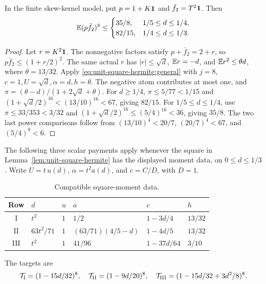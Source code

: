 \begin{corollary}
\label{cor:unit-square:two-step-path}
In the finite skew-kernel model, put \(p=1+K\mathbf1\) and
\(\bar f_2=T^2\mathbf1\). Then
\begin{equation}\label{eq:unit-square:two-step-path}
 \mathbb E(p\bar f_2)^8\le
 \begin{cases}
  35/8,&1/5\le d\le1/4,\\
  82/15,&1/4\le d\le1/3.
 \end{cases}
\end{equation}
\end{corollary}
\begin{proof}
Let \(r=K^2\mathbf1\). The nonnegative factors satisfy
\(p+\bar f_2=2+r\), so \(p\bar f_2\le(1+r/2)^2\).
The same actual \(r\) has
\(|r|\le\sqrt d\), \(\mathbb E r=-d\), and \(\mathbb E r^2\le\theta d\),
where \(\theta=13/32\). Apply
\eqref{eq:unit-square-hermite:general} with \(j=8\),
\(c=1,U=\sqrt d,\alpha=d,h=\theta\).
The negative atom contributes at most one, and
\(\pi=(\theta-d)/(1+2\sqrt d+\theta)\).
For \(d\ge1/4\), \(\pi\le5/77<1/15\) and
\((1+\sqrt d/2)^{16}<(13/10)^{16}<67\), giving \(82/15\).
For \(1/5\le d\le1/4\), use
\(\pi\le33/353<3/32\) and
\((1+\sqrt d/2)^{16}\le(5/4)^{16}<36\), giving \(35/8\).
The two last power comparisons follow from
\((13/10)^4<20/7\), \((20/7)^4<67\), and \((5/4)^8<6\).
\end{proof}

The following three scalar payments apply whenever the square in
Lemma~\ref{lem:unit-square-hermite} has the displayed moment data,
on $0\le d\le1/3$. Write $U=t\,u(d)$, $\alpha=t^2a(d)$,
and $c=C/D$, with $D=1$.
\begingroup\small
\begin{longtable}{@{}clllll@{}}
\caption{Compatible square-moment data.}
\label{tab:unit-square-data}\\
\toprule
Row & $d$ & $u$ & $a$ & $c$ & $h$\\\midrule
I & $t^2$ & $1$ & $1/2$ & $1-3d/4$ & $13/32$\\
II & $63t^2/71$ & $1$ & $(63/71)(4/5-d)$ & $1-4d/5$ & $13/32$\\
III & $t^2$ & $1$ & $41/96$ & $1-37d/64$ & $3/10$\\\bottomrule
\end{longtable}
\endgroup
The targets are
\[
 \mathcal T_{\rm I}=(1-15d/32)^8,\quad
 \mathcal T_{\rm II}=(1-9d/20)^8,\quad
 \mathcal T_{\rm III}=(1-15d/32+3d^2/8)^8.
\]

